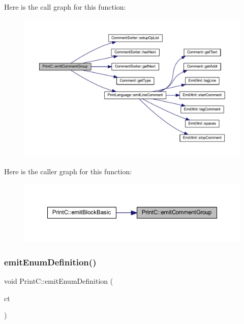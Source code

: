 Here is the call graph for this function\+:
\nopagebreak
\begin{figure}[H]
\begin{center}
\leavevmode
\includegraphics[width=350pt]{class_print_c_a010382bb95568ebcab6281ad284c0427_cgraph}
\end{center}
\end{figure}
Here is the caller graph for this function\+:
\nopagebreak
\begin{figure}[H]
\begin{center}
\leavevmode
\includegraphics[width=350pt]{class_print_c_a010382bb95568ebcab6281ad284c0427_icgraph}
\end{center}
\end{figure}
\mbox{\label{class_print_c_acbe0fabc1fd91b959cfb892fc4149df7}} 
\subsubsection{\texorpdfstring{emitEnumDefinition()}{emitEnumDefinition()}}
{\footnotesize\ttfamily void Print\+C\+::emit\+Enum\+Definition (\begin{DoxyParamCaption}\item[{const \mbox{\hyperlink{class_type_enum}{Type\+Enum}} $\ast$}]{ct }\end{DoxyParamCaption})\hspace{0.3cm}{\ttfamily [protected]}}



